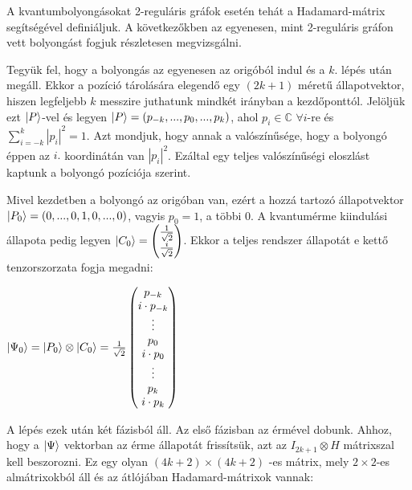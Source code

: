 A kvantumbolyongásokat 2-reguláris gráfok esetén tehát a Hadamard-mátrix
segítségével definiáljuk. A következőkben az egyenesen, mint 2-reguláris gráfon
vett bolyongást fogjuk részletesen megvizsgálni.

Tegyük fel, hogy a bolyongás az egyenesen az origóból indul és a $k.$ lépés
után megáll. Ekkor a pozíció tárolására elegendő egy $(2k+1)$ méretű
állapotvektor, hiszen legfeljebb $k$ messzire juthatunk mindkét irányban a
kezdőponttól. Jelöljük ezt $\ket{P}$-vel és legyen $\ket{P}=(p_{-k}, ..., p_0,
  ..., p_{k})$, ahol $p_i\in\mathds{C}$ $\forall i$-re és $\sum\limits_{i=-k}^{k}
  |p_i|^2 = 1$. Azt mondjuk, hogy annak a valószínűsége, hogy a bolyongó éppen az
$i.$ koordinátán van $|p_i|^2$. Ezáltal egy teljes valószínűségi eloszlást
kaptunk a bolyongó pozíciója szerint.

Mivel kezdetben a bolyongó az origóban van, ezért a hozzá tartozó állapotvektor
$\ket{P_0} = (0, ..., 0, 1, 0, ..., 0)$, vagyis $p_0=1$, a többi $0$. A kvantumérme
kiindulási állapota pedig legyen $\ket{C_0} = \begin{pmatrix} \frac{1}{\sqrt{2}} \\
    \frac{i}{\sqrt{2}}\end{pmatrix}$. Ekkor a teljes rendszer állapotát e kettő
tenzorszorzata fogja megadni:

\begin{center}
  $\ket{\Psi_0} = \ket{P_0} \otimes \ket{C_0}
    = \frac{1}{\sqrt{2}} \begin{pmatrix}
      p_{-k}         \\
      i\cdot{}p_{-k} \\
      \vdots         \\
      p_{0}          \\
      i\cdot{}p_{0}  \\
      \vdots         \\
      p_{k}          \\
      i\cdot{}p_{k}
    \end{pmatrix}
  $
\end{center}

A lépés ezek után két fázisból áll. Az első fázisban az érmével dobunk. Ahhoz, hogy
a $\ket{\Psi}$ vektorban az érme állapotát frissítsük, azt az $I_{2k+1} \otimes H$
mátrixszal kell beszorozni. Ez egy olyan $(4k+2) \times (4k+2)$ -es mátrix, mely
$2 \times 2$-es almátrixokból áll és az átlójában Hadamard-mátrixok vannak:

